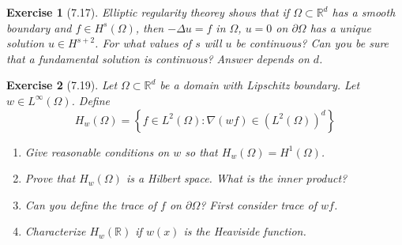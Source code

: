 \documentclass[letterpaper,twoside,11pt]{article}
\theoremstyle{mystyle}
\newtheorem*{exercise}{Exercise}
\newcommand{\R}{{\mathbb R}}
\begin{document}
\begin{exercise}[7.17]
  Elliptic regularity theorey shows that if $\Omega \subset \R^d$ has a smooth boundary and $f \in H^s\left( \Omega \right)$, then $-\Delta u = f$ in $\Omega$, $u = 0$ on $\partial \Omega$ has a unique solution $u \in H^{s+2}$. For what values of $s$ will $u$ be continuous? Can you be sure that a fundamental solution is continuous? Answer depends on $d$. 

\end{exercise}




\begin{exercise}[7.19]
  Let $\Omega \subset \R^d$ be a domain with Lipschitz boundary. Let $w\in L^\infty \left( \Omega \right)$. Define 
  \[H_w\left( \Omega \right) = \left\{f \in L^2 (\Omega) : \nabla \left( wf \right) \in \left( L^2(\Omega) \right)^d\right\}\]
\begin{enumerate}
  \item Give reasonable conditions on $w$ so that $H_w\left( \Omega \right) = H^1 \left( \Omega \right)$. 
  \item Prove that $H_w\left( \Omega \right)$ is a Hilbert space. What is the inner product? 
  \item Can you define the trace of $f$ on $\partial \Omega$? First consider trace of $wf$. 
  \item Characterize $H_w\left( \R \right)$ if $w(x)$ is the Heaviside function. 
\end{enumerate}
\end{exercise}
\end{document}
